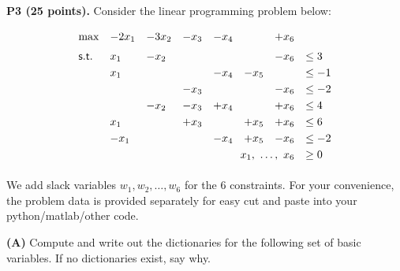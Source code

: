 \documentclass[11pt]{article}
\begin{document}
\begin{figure}[H]
\centering
\end{figure}

\newpage

\noindent\textbf{P3 (25 points).} Consider the linear programming problem below:

\[ \begin{array}{llllllllll}
\max & -2 x_1 & - 3 x_2 & - x_3 & - x_4 &  & + x_6 \\[6pt]
\mathsf{s.t.} & x_1 & - x_2 &   &   &  & - x_6 & \leq 3\\[3pt]
&  x_1 &    &     &    -x_4 &   -x_5  &  & \leq -1 \\[3pt]
&  &  & - x_3 & & & - x_6 & \leq -2 \\[3pt]
&  & -x_2 & -x_3 & + x_4 & & + x_6 & \leq 4\\[3pt]
& x_1 & & + x_3 & & + x_5 & + x_6 & \leq 6\\[3pt]
& -x_1 & &  & -x_4 & + x_5 & - x_6 & \leq -2 \\[3pt]
& \multicolumn{6}{r}{x_1,\ \ldots,\ x_6} & \geq 0\\[3pt]
\end{array}\]

We add slack variables $w_1, w_2, \ldots, w_6$ for the $6$
constraints. For your convenience, the problem data is provided
separately for easy cut and paste into your python/matlab/other code.

\noindent\textbf{(A)} Compute and write out the 
dictionaries for the following
set of basic variables. If no dictionaries exist, say why.
\end{document}
